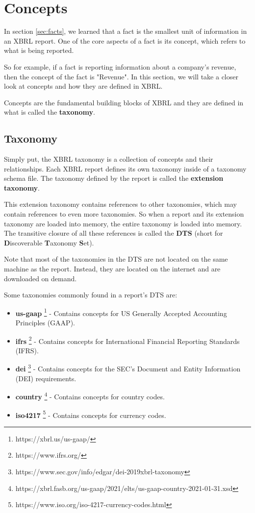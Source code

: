 \section{Concepts}
\label{sec:concepts}

In section \ref{sec:facts}, we learned that a fact is the smallest unit of information in an XBRL report. 
One of the core aspects of a fact is its concept,
which refers to what is being reported.

So for example, if a fact is reporting information about a company's revenue, then the concept of the fact is "Revenue".
In this section, we will take a closer look at concepts and how they are defined in XBRL.

Concepts are the fundamental building blocks of XBRL and they are defined in what is called the \textbf{taxonomy}.

\subsection{Taxonomy}

Simply put, the XBRL taxonomy is a collection of concepts and their relationships.
Each XBRL report defines its own taxonomy inside of a taxonomy schema file. 
The taxonomy defined by the report is called the \textbf{extension taxonomy}.

This extension taxonomy contains references to other taxonomies, which may contain references to even more taxonomies.
So when a report and its extension taxonomy are loaded into memory, the entire taxonomy is loaded into memory.
The transitive closure of all these references is called the \textbf{DTS} (short for \textbf{D}iscoverable \textbf{T}axonomy \textbf{S}et).

Note that most of the taxonomies in the DTS are not located on the same machine as the report.
Instead, they are located on the internet and are downloaded on demand.

Some taxonomies commonly found in a report's DTS are:

\begin{itemize}
    \item \textbf{us-gaap} \footnote{https://xbrl.us/us-gaap/} - Contains concepts for US Generally Accepted Accounting Principles (GAAP).
    \item \textbf{ifrs} \footnote{https://www.ifrs.org/} - Contains concepts for International Financial Reporting Standards (IFRS).
    \item \textbf{dei} \footnote{https://www.sec.gov/info/edgar/dei-2019xbrl-taxonomy} - Contains concepts for the SEC's Document and Entity Information (DEI) requirements.
    \item \textbf{country} \footnote{https://xbrl.fasb.org/us-gaap/2021/elts/us-gaap-country-2021-01-31.xsd} - Contains concepts for country codes.
    \item \textbf{iso4217} \footnote{https://www.iso.org/iso-4217-currency-codes.html} - Contains concepts for currency codes.
\end{itemize}


